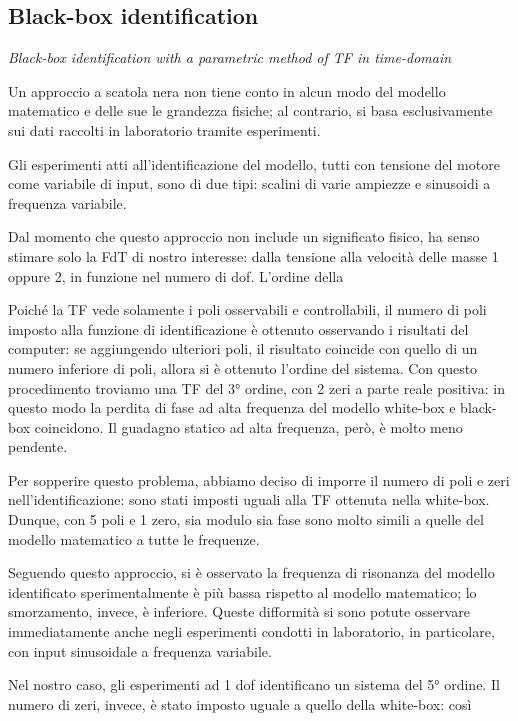 \subsection{Black-box identification}

\textit{Black-box identification with a parametric method of TF in time-domain}
\\ \par Un approccio a scatola nera non tiene conto in alcun modo del modello matematico e delle sue le grandezza fisiche; al contrario, si basa esclusivamente sui dati raccolti in laboratorio tramite esperimenti.

Gli esperimenti atti all'identificazione del modello, tutti con tensione del motore come variabile di input, sono di due tipi: scalini di varie ampiezze e sinusoidi a frequenza variabile. 

Dal momento che questo approccio non include un significato fisico, ha senso stimare solo la FdT di nostro interesse: dalla tensione alla velocità delle masse 1 oppure 2, in funzione nel numero di dof. 
L'ordine della 





Poiché la TF vede solamente i poli osservabili e controllabili, il numero di poli imposto alla funzione di identificazione è ottenuto osservando i risultati del computer: se aggiungendo ulteriori poli, il risultato coincide con quello di un numero inferiore di poli, allora si è ottenuto l'ordine del sistema.
Con questo procedimento troviamo una TF del 3° ordine, con 2 zeri a parte reale positiva: in questo modo la perdita di fase ad alta frequenza del modello white-box e black-box coincidono. Il guadagno statico ad alta frequenza, però, è molto meno pendente.

Per sopperire questo problema, abbiamo deciso di imporre il numero di poli e zeri nell'identificazione: sono stati imposti uguali alla TF ottenuta nella white-box. Dunque, con 5 poli e 1 zero, sia modulo sia fase sono molto simili a quelle del modello matematico a tutte le frequenze.

Seguendo questo approccio, si è osservato la frequenza di risonanza del modello identificato sperimentalmente è più bassa rispetto al modello matematico; lo smorzamento, invece, è inferiore.
Queste difformità si sono potute osservare immediatamente anche negli esperimenti condotti in laboratorio, in particolare, con input sinusoidale a frequenza variabile.

Nel nostro caso, gli esperimenti ad 1 dof identificano un sistema del 5° ordine.
Il numero di zeri, invece, è stato imposto uguale a quello della white-box: così 

